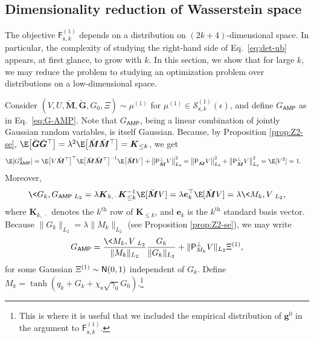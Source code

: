\documentclass[]{article}
\def\sx{{\mathsf x}}
\def\normal{{\sf N}}
\def\proj{{\mathsf P}}
\def\be{{\boldsymbol e}}
\def\bg{{\boldsymbol g}}
\def\proj{{\mathsf P}}
\def\normal{{\sf N}}
\def\be{{\boldsymbol e}}
\def\bg{{\boldsymbol g}}
\def\cS{{\mathcal S}}
\def\cS{{\mathcal S}}
\def\bK{\boldsymbol{K}}
\def\AMP{\mathsf{AMP}}
\def\sF{\mathsf{F}}
\def\brevebM{\breve{\boldsymbol{M}}{}}
\def\brevebG{\breve{\boldsymbol{G}}{}}
\begin{document}
\subsection{Dimensionality reduction of Wasserstein space}

The objective $\sF_{\sx,k}^{(1)}$ depends on a distribution on $(2k+4)$-dimensional space.
In particular, the complexity of studying the right-hand side of Eq.~\eqref{eq:det-ub} appears, at first glance, to grow with $k$.
In this section,
we show that for large $k$,
we may reduce the problem to studying an optimization problem over distributions on a low-dimensional space.

Consider $(V,U,\brevebM,\brevebG,G_0,\Xi) \sim \mu^{(1)}$ for $\mu^{(1)} \in \cS^{(1)}_{\sx,k}(\epsilon)$,
and define $G_{\AMP}$ as in Eq.~\eqref{eq:G-AMP}.
Note that $G_{\AMP}$, being a linear combination of jointly Gaussian random variables, is itself Gaussian. 
Because,
by Proposition \ref{prop:Z2-se},
$\E\big[\brevebG\brevebG^\top\big] = \lambda^2\E\big[\brevebM \brevebM^\top\big] = \bK_{\leq k}$,
we get
\begin{equation}
\begin{aligned}
    \E[G_{\AMP}^2]
        &=
        \E\big[V \brevebM^\top \big]^\top 
        \E\big[\brevebM \brevebM^\top\big]^{-1}
        \E\big[\brevebM V\big]
        + 
        \big\| \proj_{\brevebM}^\perp V \big\|_{L_2}^2
        =
        \big\| \proj_{\brevebM} V \big\|_{L_2}^2 + \big\| \proj_{\brevebM}^\perp V \big\|_{L_2}^2
        = \E[V^2] = 1.
\end{aligned}
\end{equation}
Moreover, 
\begin{equation}
    \< G_k , G_{\AMP} \>_{L_2}
        =
        \lambda \bK_{k,\,\cdot\,} \bK_{\leq k}^{-1} \E[\brevebM V]
        =
        \lambda \be_k^\top \E[\brevebM V]
        = 
        \lambda \<M_k,V\>_{L_2},
\end{equation}
where $\bK_{k,\,\cdot\,}$ denotes the $k^\text{th}$ row of $\bK_{\leq k}$,
and $\be_k$ is the $k^\text{th}$ standard basis vector.
Because $\| G_k \|_{L_2} = \lambda \| M_k \|_{L_2}$ (see Proposition \ref{prop:Z2-se}),
we may write
\begin{equation}
    G_{\AMP} = \frac{\<M_k,V\>_{L_2}}{\| M_k \|_{L_2}} \frac{G_k}{\|G_k\|_{L_2}} + \| \proj_{M_k}^\perp V \|_{L_2} \Xi^{(1)},
\end{equation}
for some Gaussian $\Xi^{(1)} \sim \normal(0,1)$ independent of $G_k$.
Define $M_k = \tanh(q_k + G_k + \chi_{\sx} \sqrt{\gamma_0}G_0 )$.\footnote{This is where it is useful that we included the empirical distribution of $\bg^0$ in the argument to $\sF_{\sx,k}^{(1)}$.}
\end{document}
